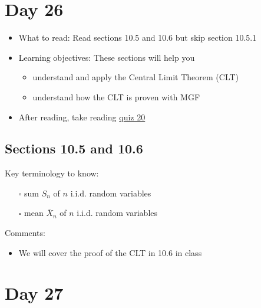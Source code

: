\documentclass[
  letterpaper,
]{scrbook}
\providecommand{\tightlist}{%
  \setlength{\itemsep}{0pt}\setlength{\parskip}{0pt}}\usepackage{longtable,booktabs,array}
\begin{document}
\section*{Day 26}\label{day-26}


\begin{itemize}
\item
  What to read: Read sections 10.5 and 10.6 but skip section 10.5.1
\item
  Learning objectives: These sections will help you

  \begin{itemize}
  \tightlist
  \item
    understand and apply the Central Limit Theorem (CLT)
  \item
    understand how the CLT is proven with MGF
  \end{itemize}
\item
  After reading, take reading
  \href{https://forms.gle/6GziRQC46YbXrSE79}{quiz 20}
\end{itemize}

\subsection*{Sections 10.5 and 10.6}\label{sections-10.5-and-10.6}

Key terminology to know:

\begin{itemize}
\tightlist
\item[$\square$]
  sum \(S_n\) of \(n\) i.i.d. random variables
\item[$\square$]
  mean \(\bar{X}_n\) of \(n\) i.i.d. random variables
\end{itemize}

Comments:

\begin{itemize}
\tightlist
\item
  We will cover the proof of the CLT in 10.6 in class
\end{itemize}

\section*{Day 27}\label{day-27}

\end{document}
